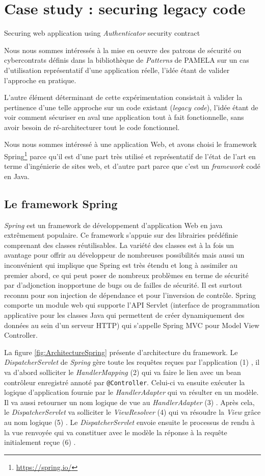\section{Case study : securing legacy code}
\label{sec:case-study}

Securing web application using \textit{Authenticator} security contract

Nous nous sommes intéressés à la mise en oeuvre des patrons de sécurité ou cybercontrats définis dans la bibliothèque de \textit{Patterns} de PAMELA sur un cas d'utilisation représentatif d'une application réelle, l'idée étant de valider l'approche en pratique. 

L'autre élément déterminant de cette expérimentation consistait à valider la pertinence d'une telle approche sur un code existant (\textit{legacy code}), l'idée étant de voir comment sécuriser en aval une application tout à fait fonctionnelle, sans avoir besoin de ré-architecturer tout le code fonctionnel.

Nous nous sommes intéressé à une application Web, et avons choisi le framework Spring\footnote{\url{https://spring.io/}} parce qu'il est d'une part très utilisé et représentatif de l'état de l'art en terme d'ingénierie de sites web, et d'autre part parce que c'est un \textit{framework} codé en Java.

\subsection{Le framework Spring}

\textit{Spring} est un framework de développement d'application Web en java extrêmement populaire.  Ce framework s'appuie sur des librairies prédéfinie comprenant des classes réutilisables. La variété des classes est à la fois un avantage pour offrir au développeur de nombreuses possibilités mais aussi un inconvénient qui implique que Spring est très étendu et long à assimiler au premier abord, ce qui peut poser de nombreux problèmes en terme de sécurité par d'adjonction inopportune de bugs ou de failles de sécurité. Il est surtout reconnu pour son injection de dépendance et pour l’inversion de contrôle. Spring comporte un module web qui supporte l’API Servlet (interface de programmation applicative pour les classes Java qui permettent de créer dynamiquement des données au sein d’un serveur HTTP) qui s’appelle Spring MVC pour Model View Controller.

La figure \ref{fig:ArchitectureSpring} présente d'architecture du framework.
Le \textit{DispatcherServlet} de \textit{Spring} gère toute les requêtes reçues par l’application (1) , il va d’abord solliciter le \textit{HandlerMapping} (2) qui va faire le lien avec un bean contrôleur enregistré annoté par \texttt{@Controller}. Celui-ci va ensuite exécuter la logique d’application fournie par le \textit{HandlerAdapter} qui va résulter en un modèle. Il va aussi retourner un nom logique de vue au \textit{HandlerAdapter} (3) . Après cela, le \textit{DispatcherServlet} va solliciter le \textit{ViewResolver} (4) qui va résoudre la \textit{View} grâce au nom logique (5) . Le \textit{DispatcherServlet} envoie ensuite le processus de rendu à la vue renvoyée qui va constituer avec le modèle la réponse à la requête initialement reçue (6) .

